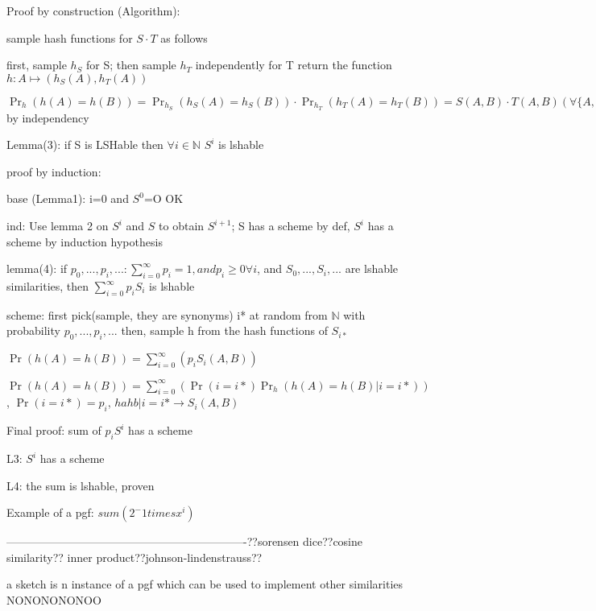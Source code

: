 \documentclass{report}
\begin{document}
	Proof by construction (Algorithm): 
	
	sample hash functions for $S \cdot T$ as follows
	
	first, sample $h_S$ for S;
	then sample $h_T$ independently for T
	return the function $h : A \mapsto (h_S(A), h_T(A))$
	
	$\Pr_h(h(A)=h(B)) = \Pr_{h_S}(h_S(A)=h_S(B)) \cdot \Pr_{h_T}(h_T(A)=h_T(B)) = S(A, B) \cdot T(A, B) (\forall \{A, B\} \in \mathcal{P}_2(U))$by independency
	
	
	Lemma(3): if S is LSHable then $\forall i \in \mathbb{N}$ $S^i$ is lshable
	
	proof by induction:
	
	base (Lemma1): i=0 and $S^0$=O OK
	
	ind: Use lemma 2 on $S^i$ and $S$ to obtain $S^{i+1}$; S has a scheme by def, $S^i$ has a scheme by induction hypothesis
	
	
	lemma(4): if $p_0, ..., p_i, ... : \sum_{i=0}^{\infty}p_i=1 , and p_i\geq 0 \forall i$, and $S_0, ..., S_i, ...$ are lshable similarities, then $\sum_{i=0}^{\infty}p_iS_i$ is lshable
	
	scheme: first pick(sample, they are synonyms) i* at random from $\mathbb{N}$ with probability $p_0, ..., p_i, ...$
	then, sample h from the hash functions of $S_{i*}$
	
	$\Pr(h(A)=h(B))=\sum_{i=0}^{\infty}(p_i S_i(A, B))$
	
	$\Pr(h(A)=h(B))=\sum_{i=0}^{\infty}(\Pr(i=i*)\Pr_h(h(A)=h(B) | i=i*))$, $\Pr(i=i*) = p_i$, $hahb|i=i* \to S_i(A, B)$
	
	
	Final proof: sum of $p_iS^i$ has a scheme
	
	L3: $S^i$ has a scheme
	
	L4: the sum is lshable, proven
	
	
	Example of a pgf: $sum(2^-1 times x^i)$
	
	
	----------------------------------------------------------------??sorensen dice??cosine similarity?? inner product??johnson-lindenstrauss??
	
	a sketch is n instance of a pgf which can be used to implement other similarities NONONONONOO
	
\end{document}
